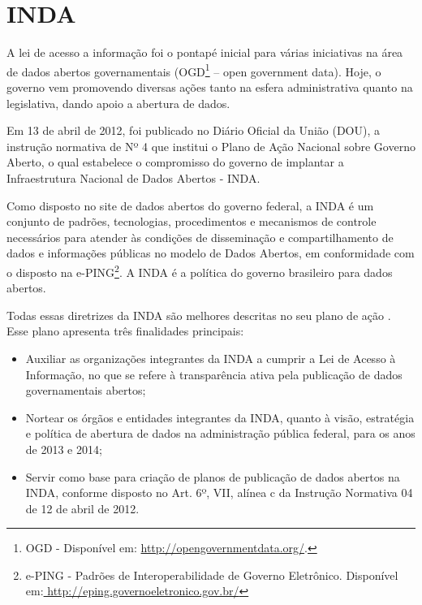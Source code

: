 \section{INDA}
\label{sec-proc-sl}

A lei de acesso a informação \cite{lai}  foi o pontapé inicial para várias iniciativas na área de dados abertos governamentais (OGD\footnote{OGD - Disponível em: \url{http://opengovernmentdata.org/}.} – open government data). Hoje, o governo vem promovendo diversas ações tanto na esfera administrativa quanto na legislativa, dando apoio a abertura de dados. 

Em 13 de abril de 2012, foi publicado no Diário Oficial da União (DOU), a instrução normativa de Nº 4 que institui o Plano de Ação Nacional sobre Governo Aberto, o qual estabelece o compromisso do governo de implantar a Infraestrutura Nacional de Dados Abertos - INDA.

Como disposto no site de dados abertos do governo federal, a INDA é um conjunto de padrões, tecnologias, procedimentos e mecanismos de controle necessários para atender às condições de disseminação e compartilhamento de dados e informações públicas no modelo de Dados Abertos, em conformidade com o disposto na e-PING\footnote{e-PING - Padrões de Interoperabilidade de Governo Eletrônico. Disponível em:\url{ http://eping.governoeletronico.gov.br/}}. A INDA é a política do governo brasileiro para dados abertos.

Todas essas diretrizes da INDA são melhores descritas no seu plano de ação \cite{planoinda}. Esse plano apresenta três finalidades principais:

\begin{itemize}

\item {Auxiliar as organizações integrantes da INDA a cumprir a Lei de Acesso à Informação, no que se refere à transparência ativa pela publicação de dados governamentais abertos; }

\item {Nortear os órgãos e entidades integrantes da INDA, quanto à visão, estratégia e política de abertura de dados na administração pública federal, para os anos de 2013 e 2014; }

\item {Servir como base para criação de planos de publicação de dados abertos na INDA, conforme disposto no Art. 6º, VII, alínea c da Instrução Normativa 04 de 12 de abril de 2012.}

\end{itemize}

